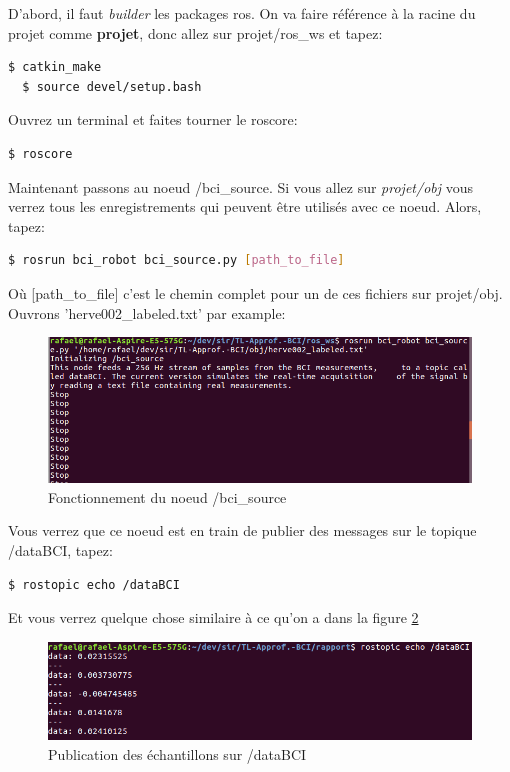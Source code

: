 D'abord, il faut \textit{builder} les packages ros. On va faire référence à la racine du projet comme \textbf{projet}, donc allez sur projet/ros\_ws et tapez:
\begin{lstlisting}[language=bash]
  $ catkin_make
  $ source devel/setup.bash
\end{lstlisting}

Ouvrez un terminal et faites tourner le roscore:

\begin{lstlisting}[language=bash]
  $ roscore
\end{lstlisting}

Maintenant passons au noeud /bci\_source. Si vous allez sur \textit{projet/obj} vous verrez tous les enregistrements qui peuvent être utilisés avec ce noeud. Alors, tapez: 
\begin{lstlisting}[language=bash]
  $ rosrun bci_robot bci_source.py [path_to_file]
\end{lstlisting}
Où [path\_to\_file] c'est le chemin complet pour un de ces fichiers sur projet/obj. Ouvrons 'herve002\_labeled.txt' par example:

\begin{figure}[!h]
  \centering
	\includegraphics[scale=0.50]{bci1.png}
	\caption{Fonctionnement du noeud /bci\_source}
	\label{fig:bci1}
\end{figure}

Vous verrez que ce noeud est en train de publier des messages sur le topique /dataBCI, tapez:
\begin{lstlisting}[language=bash]
  $ rostopic echo /dataBCI
\end{lstlisting}

Et vous verrez quelque chose similaire à ce qu'on a dans la figure \ref{fig:bci2}

\begin{figure}[!h]
  \centering
	\includegraphics[scale=0.50]{bci2.png}
	\caption{Publication des échantillons sur /dataBCI}
	\label{fig:bci2}
\end{figure}

